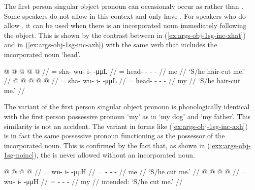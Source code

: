 The first person singular object pronoun can occasionaly occur as  rather than . Some speakers do not allow  in this context and only have . For speakers who do allow , it can be used when there is an incorporated noun immediately following the object. This is shown by the contrast between  in (\ref{ex:args-obj-1sg-inc-xhat}) and  in (\ref{ex:args-obj-1sg-inc-axh}) with the same verb that includes the incorporated noun  ‘head’.

\pex\label{exx:args-obj-1sg-inc}%
\a\label{ex:args-obj-1sg-inc-xhat}%
%
\begingl
	\gla	{} @  @ {} @ {} @ {} @ {} //
	\glb	{}= sha- wu- i-  -μμL //
	\glc	{}= head- - -  - //
	\gld	me  {} {} {} {} //
	\glft	‘S/he hair-cut me.’
		//
\endgl
\a\label{ex:args-obj-1sg-inc-axh}%
%
\begingl
	\gla	{} @  @ {} @ {} @ {} @ {} //
	\glb	{}= sha- wu- i-  -μμL //
	\glc	{}= head- - -  - //
	\gld	my  {} {} {} {} //
	\glft	‘S/he hair-cut me.’
		//
\endgl
\xe

The  variant of the first person singular object pronoun is phonologically identical with the first person possessive pronoun  ‘my’ as in  ‘my dog’ and  ‘my father’. This similarity is not an accident. The  variant in forms like (\ref{ex:args-obj-1sg-inc-axh}) is in fact the same possessive pronoun functioning as the possessor of the incorporated noun. This is confirmed by the fact that, as shown in (\ref{exx:args-obj-1sg-noinc}), the  is never allowed without an incorporated noun.

\pex\label{exx:args-obj-1sg-noinc}%
\a\label{ex:args-obj-1sg-noinc-xhat}%
%
\begingl
	\gla	{} @  @ {} @ {} @ {} //
	\glb	{}= wu- i-  -μμH //
	\glc	{}= - -  - //
	\gld	me  //
	\glft	‘S/he cut me.’
		//
\endgl
\a\label{ex:args-obj-1sg-noinc-axh}%
\ljudge{*}%
%
\begingl
	\gla	{} @  @ {} @ {} @ {} //
	\glb	{}= wu- i-  -μμH //
	\glc	{}= - -  - //
	\gld	my  //
	\glft	intended: ‘S/he cut me.’
		//
\endgl
\xe

